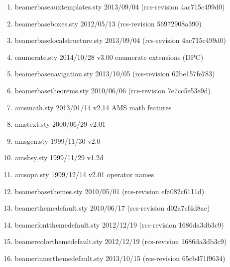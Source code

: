 \begin{enumerate}
\item beamerbaseauxtemplates.sty 2013/09/04 (rcs-revision 4ac715c499d0)
\item beamerbaseboxes.sty 2012/05/13 (rcs-revision 56972908a390)
\item beamerbaselocalstructure.sty 2013/09/04 (rcs-revision 4ac715c499d0)
\item enumerate.sty 2014/10/28 v3.00 enumerate extensions (DPC)
\item beamerbasenavigation.sty 2013/10/05 (rcs-revision 62be157fe783)
\item beamerbasetheorems.sty 2010/06/06 (rcs-revision 7e7cc5e53e9d)
\item amsmath.sty 2013/01/14 v2.14 AMS math features
\item amstext.sty 2000/06/29 v2.01
\item amsgen.sty 1999/11/30 v2.0
\item amsbsy.sty 1999/11/29 v1.2d
\item amsopn.sty 1999/12/14 v2.01 operator names
\item beamerbasethemes.sty 2010/05/01 (rcs-revision efa082c6111d)
\item beamerthemedefault.sty 2010/06/17 (rcs-revision d02a7cf4d8ae)
\item beamerfontthemedefault.sty 2012/12/19 (rcs-revision 1686da3db3c9)
\item beamercolorthemedefault.sty 2012/12/19 (rcs-revision 1686da3db3c9)
\item beamerinnerthemedefault.sty 2013/10/15 (rcs-revision 65cb471f9634)

\end{enumerate}
